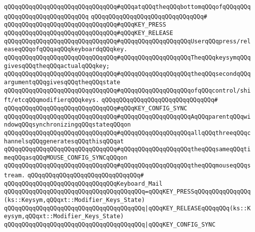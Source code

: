 \verb|qQQqqQQqqQQqqQQqqQQqqQQqqQQqqQQq#qQQqatqQQqtheqQQqbottomqQQqofqQQqqQQqqQQqqQQq|\verb|qQQqqQQqqQQqqQQq|\newline
\verb|qQQqqQQqqQQqqQQqqQQqqQQqqQQqqQQq#|\newline
\verb|qQQqqQQqqQQqqQQqqQQqqQQqqQQqqQQq#qQQqKEY_PRESS|\newline
\verb|qQQqqQQqqQQqqQQqqQQqqQQqqQQqqQQq#qQQqKEY_RELEASE|\newline
\verb|qQQqqQQqqQQqqQQqqQQqqQQqqQQqqQQq#qQQqqQQqqQQqqQQqqQQqUserqQQqpress/releaseqQQqofqQQqaqQQqkeyboardqQQqkey.|\newline
\verb|qQQqqQQqqQQqqQQqqQQqqQQqqQQqqQQq#qQQqqQQqqQQqqQQqqQQqTheqQQqkeysymqQQqgivesqQQqtheqQQqactualqQQqkey;|\newline
\verb|qQQqqQQqqQQqqQQqqQQqqQQqqQQqqQQq#qQQqqQQqqQQqqQQqqQQqtheqQQqsecondqQQqargumentqQQqgivesqQQqtheqQQqstate|\newline
\verb|qQQqqQQqqQQqqQQqqQQqqQQqqQQqqQQq#qQQqqQQqqQQqqQQqqQQqofqQQqcontrol/shift/etcqQQqmodifierqQQqkeys.|\newline
\verb|qQQqqQQqqQQqqQQqqQQqqQQqqQQqqQQq#|\newline
\verb|qQQqqQQqqQQqqQQqqQQqqQQqqQQqqQQq#qQQqKEY_CONFIG_SYNC|\newline
\verb|qQQqqQQqqQQqqQQqqQQqqQQqqQQqqQQq#qQQqqQQqqQQqqQQqqQQqAqQQqparentqQQqwindowqQQqsynchronizingqQQqstateqQQqon|\newline
\verb|qQQqqQQqqQQqqQQqqQQqqQQqqQQqqQQq#qQQqqQQqqQQqqQQqqQQqallqQQqthreeqQQqchannelsqQQqgeneratesqQQqthisqQQqat|\newline
\verb|qQQqqQQqqQQqqQQqqQQqqQQqqQQqqQQq#qQQqqQQqqQQqqQQqqQQqtheqQQqsameqQQqtimeqQQqasqQQqMOUSE_CONFIG_SYNCqQQqon|\newline
\verb|qQQqqQQqqQQqqQQqqQQqqQQqqQQqqQQq#qQQqqQQqqQQqqQQqqQQqtheqQQqmouseqQQqstream.|\newline
\verb|qQQqqQQqqQQqqQQqqQQqqQQqqQQqqQQq#|\newline
\verb|qQQqqQQqqQQqqQQqqQQqqQQqqQQqqQQqKeyboard_Mail|\newline
\verb|qQQqqQQqqQQqqQQqqQQqqQQqqQQqqQQqqQQqqQQq=qQQqKEY_PRESSqQQqqQQqqQQqqQQq(ks::Keysym,qQQqxt::Modifier_Keys_State)|\newline
\verb|qQQqqQQqqQQqqQQqqQQqqQQqqQQqqQQqqQQqqQQq|\verb#|qQQqKEY_RELEASEqQQqqQQq(ks::Keysym,qQQqxt::Modifier_Keys_State)#\newline
\verb|qQQqqQQqqQQqqQQqqQQqqQQqqQQqqQQqqQQqqQQq|\verb#|qQQqKEY_CONFIG_SYNC#\newline
